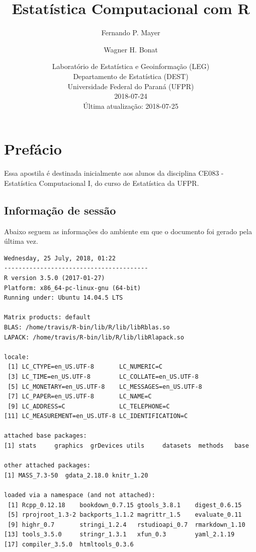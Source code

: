 \documentclass[10pt,a4paper]{book}
\title{Estatística Computacional com R}
\author{Fernando P. Mayer \and Wagner H. Bonat}
\date{Laboratório de Estatística e Geoinformação (LEG)\\
Departamento de Estatística (DEST)\\
Universidade Federal do Paraná (UFPR)\\[2\baselineskip]2018-07-24\\
Última atualização: 2018-07-25}
\begin{document}
\maketitle

{
\hypersetup{linkcolor=black}
\setcounter{tocdepth}{2}
\tableofcontents
}
\chapter*{Prefácio}\label{prefacio}


Essa apostila é destinada inicialmente aos alunos da disciplina CE083 -
Estatística Computacional I, do curso de Estatística da UFPR.

\section*{Informação de sessão}\label{informacao-de-sessao}


Abaixo seguem as informações do ambiente em que o documento foi gerado
pela última vez.

\begin{verbatim}
Wednesday, 25 July, 2018, 01:22
----------------------------------------
R version 3.5.0 (2017-01-27)
Platform: x86_64-pc-linux-gnu (64-bit)
Running under: Ubuntu 14.04.5 LTS

Matrix products: default
BLAS: /home/travis/R-bin/lib/R/lib/libRblas.so
LAPACK: /home/travis/R-bin/lib/R/lib/libRlapack.so

locale:
 [1] LC_CTYPE=en_US.UTF-8       LC_NUMERIC=C              
 [3] LC_TIME=en_US.UTF-8        LC_COLLATE=en_US.UTF-8    
 [5] LC_MONETARY=en_US.UTF-8    LC_MESSAGES=en_US.UTF-8   
 [7] LC_PAPER=en_US.UTF-8       LC_NAME=C                 
 [9] LC_ADDRESS=C               LC_TELEPHONE=C            
[11] LC_MEASUREMENT=en_US.UTF-8 LC_IDENTIFICATION=C       

attached base packages:
[1] stats     graphics  grDevices utils     datasets  methods   base     

other attached packages:
[1] MASS_7.3-50  gdata_2.18.0 knitr_1.20  

loaded via a namespace (and not attached):
 [1] Rcpp_0.12.18    bookdown_0.7.15 gtools_3.8.1    digest_0.6.15  
 [5] rprojroot_1.3-2 backports_1.1.2 magrittr_1.5    evaluate_0.11  
 [9] highr_0.7       stringi_1.2.4   rstudioapi_0.7  rmarkdown_1.10 
[13] tools_3.5.0     stringr_1.3.1   xfun_0.3        yaml_2.1.19    
[17] compiler_3.5.0  htmltools_0.3.6
\end{verbatim}
\end{document}
